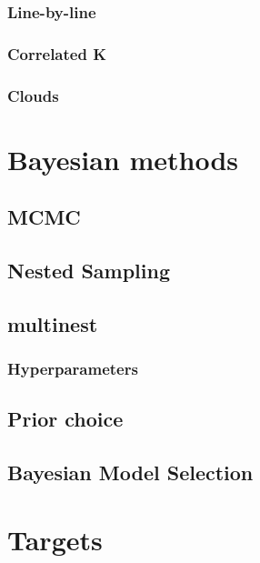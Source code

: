 \subsubsection{Line-by-line}
\subsubsection{Correlated K}
\cite{Goody1989} %
\cite{Lacis1991} %
\subsubsection{Clouds}
\cite{Line2016} %
\cite{Faherty2018} %
\cite{Morley2014} %
\section{Bayesian methods}
\cite{Lavie2017} %
\subsection{MCMC}
\cite{Foreman-Mackey2013} %
\cite{Speagle2019} %
\cite{MacKay2003} %
\subsection{Nested Sampling}
\cite{Skilling2004} %
\cite{Feroz2007} %
\cite{Feroz2008} %
\cite{Feroz2014} %
\cite{Feroz2019} %
\subsection{multinest}
\subsubsection{Hyperparameters}
\subsection{Prior choice}
\subsection{Bayesian Model Selection}
\section{Targets}
